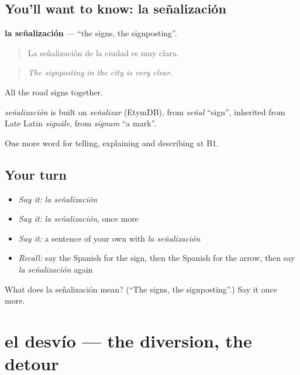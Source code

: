 \subsection*{You'll want to know: la señalización}
\textbf{la señalización} — \textquotedblleft{}the signs, the signposting\textquotedblright{}.

\begin{quote}
La señalización de la ciudad es muy clara.
\end{quote}

\begin{quote}
\emph{The signposting in the city is very clear.}
\end{quote}

All the road signs together.

\begin{cousinweb}
\emph{señalización} is built on \emph{señalizar} (EtymDB), from \emph{señal} \textquotedblleft{}sign\textquotedblright{}, inherited from Late Latin \emph{signāle}, from \emph{signum} \textquotedblleft{}a mark\textquotedblright{}.
\end{cousinweb}

\begin{grammarlens}[title={What you've built}]
One more word for telling, explaining and describing at B1.
\end{grammarlens}

\subsection*{Your turn}
\begin{itemize}
\raggedright
  \item \emph{Say it:} \emph{la señalización}
  \item \emph{Say it:} \emph{la señalización}, once more
  \item \emph{Say it:} a sentence of your own with \emph{la señalización}
  \item \emph{Recall:} say the Spanish for the sign, then the Spanish for the arrow, then say \emph{la señalización} again
\end{itemize}

\begin{tcolorbox}[breakable,colback=teal!4,colframe=teal!35!black,title={Before you move on}]
What does la señalización mean? (\textquotedblleft{}The signs, the signposting\textquotedblright{}.) Say it once more.
\end{tcolorbox}
\section[el desvío]{el desvío — the diversion, the detour}

